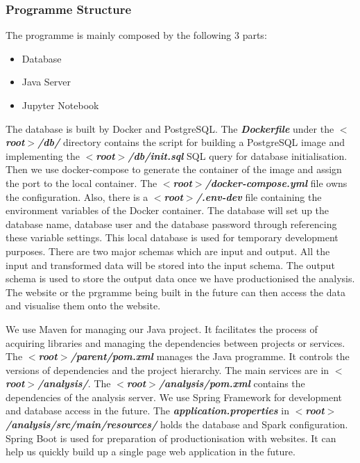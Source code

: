 \documentclass[11pt]{article} %
\theoremstyle{plain}
\theoremstyle{definition}
\begin{document}
\subsubsection{Programme Structure}

The programme is mainly composed by the following 3 parts:
\begin{itemize}
    \item Database
    \item Java Server
    \item Jupyter Notebook
\end{itemize}

The database is built by Docker and PostgreSQL. The \textsl{\textbf{Dockerfile}} under the \textsl{\textbf{$<$root$>$/db/}} directory contains the script for building a PostgreSQL image and implementing the \textsl{\textbf{$<$root$>$/db/init.sql}} SQL query for database initialisation. Then we use docker-compose to generate the container of the image and assign the port to the local container. The \textsl{\textbf{$<$root$>$/docker-compose.yml}} file owns the configuration. Also, there is a \textsl{\textbf{$<$root$>$/.env-dev}} file containing the environment variables of the Docker container. The database will set up the database name, database user and the database password through referencing these variable settings. This local database is used for temporary development purposes. There are two major schemas which are input and output. All the input and transformed data will be stored into the input schema. The output schema is used to store the output data once we have productionised the analysis. The website or the prgramme being built in the future can then access the data and visualise them onto the website.

We use Maven for managing our Java project. It facilitates the process of acquiring libraries and managing the dependencies between projects or services. The \textsl{\textbf{$<$root$>$/parent/pom.xml}} manages the Java programme. It controls the versions of dependencies and the project hierarchy. The main services are in \textsl{\textbf{$<$root$>$/analysis/}}. The \textsl{\textbf{$<$root$>$/analysis/pom.xml}} contains the dependencies of the analysis server. We use Spring Framework for development and database access in the future. The \textsl{\textbf{application.properties}} in \textsl{\textbf{$<$root$>$/analysis/src/main/resources/}} holds the database and Spark configuration. Spring Boot is used for preparation of productionisation with websites. It can help us quickly build up a single page web application in the future.
\end{document}
